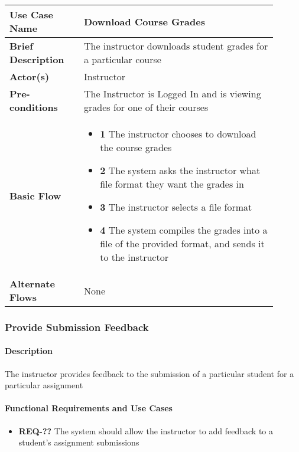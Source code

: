 \documentclass{article}
\begin{document}
\vspace{0.2in}

\begin{tabular}{| p{0.25\linewidth} | p{0.65\linewidth} |}
  \hline
  \textbf{Use Case Name} & Download Course Grades \\
  \hline
  \textbf{Brief Description} & The instructor downloads student grades for a particular course \\
  \hline
  \textbf{Actor(s)} & Instructor \\
  \hline
  \textbf{Pre-conditions} & The Instructor is Logged In and is viewing grades for one of their courses\\
  \hline
  \textbf{Basic Flow} & \begin{itemize}
    \item[] \textbf{1} The instructor chooses to download the course grades
    \item[] \textbf{2} The system asks the instructor what file format they want the grades in
    \item[] \textbf{3} The instructor selects a file format
    \item[] \textbf{4} The system compiles the grades into a file of the provided format, and sends it to the instructor
  \end{itemize}\\
  \hline
  \textbf{Alternate Flows} & None\\
  \hline
\end{tabular}

\subsubsection{Provide Submission Feedback}

\paragraph{Description} The instructor provides feedback to the submission of a particular student for a particular assignment

\paragraph{Functional Requirements and Use Cases}

\begin{itemize}
  \item \textbf{REQ-??} The system should allow the instructor to add feedback to a student's assignment submissions
\end{itemize}
\end{document}
